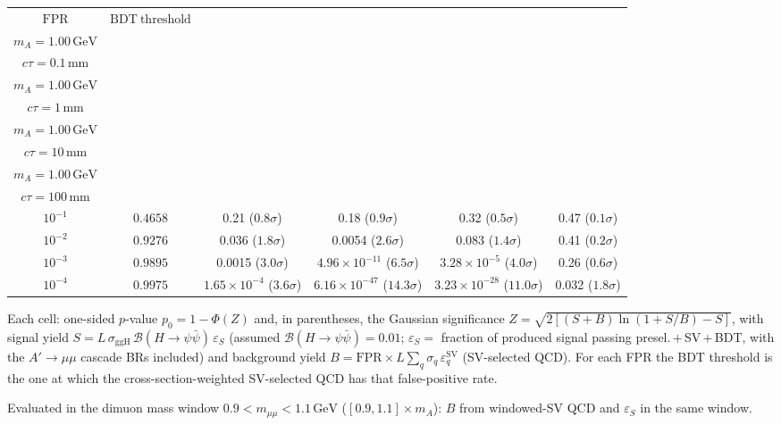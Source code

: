 \documentclass[10pt,a4paper]{article}
\begin{document}
{\begin{tabular}{cccccc}
\toprule
$\mathrm{FPR}$ & $\mathrm{BDT\ threshold}$ & \shortstack{$m_{\pi}=10\,\mathrm{GeV}$\\$m_{A}=1.00\,\mathrm{GeV}$\\$c\tau=0.1\,\mathrm{mm}$} & \shortstack{$m_{\pi}=10\,\mathrm{GeV}$\\$m_{A}=1.00\,\mathrm{GeV}$\\$c\tau=1\,\mathrm{mm}$} & \shortstack{$m_{\pi}=10\,\mathrm{GeV}$\\$m_{A}=1.00\,\mathrm{GeV}$\\$c\tau=10\,\mathrm{mm}$} & \shortstack{$m_{\pi}=10\,\mathrm{GeV}$\\$m_{A}=1.00\,\mathrm{GeV}$\\$c\tau=100\,\mathrm{mm}$} \\
\midrule
$10^{-1}$ & $0.4658$ & 0.21 ($0.8\sigma$) & 0.18 ($0.9\sigma$) & 0.32 ($0.5\sigma$) & 0.47 ($0.1\sigma$)\\
$10^{-2}$ & $0.9276$ & 0.036 ($1.8\sigma$) & 0.0054 ($2.6\sigma$) & 0.083 ($1.4\sigma$) & 0.41 ($0.2\sigma$)\\
$10^{-3}$ & $0.9895$ & 0.0015 ($3.0\sigma$) & $4.96\times10^{-11}$ ($6.5\sigma$) & $3.28\times10^{-5}$ ($4.0\sigma$) & 0.26 ($0.6\sigma$)\\
$10^{-4}$ & $0.9975$ & $1.65\times10^{-4}$ ($3.6\sigma$) & $6.16\times10^{-47}$ ($14.3\sigma$) & $3.23\times10^{-28}$ ($11.0\sigma$) & 0.032 ($1.8\sigma$)\\
\bottomrule
\end{tabular}

{\small Each cell: one-sided $p$-value $p_0=1-\Phi(Z)$ and, in parentheses, the Gaussian significance $Z=\sqrt{2\left[(S{+}B)\ln(1{+}S/B)-S\right]}$, with signal yield $S=L\,\sigma_{\mathrm{ggH}}\,\mathcal{B}(H\to\psi\bar{\psi})\,\varepsilon_S$ (assumed $\mathcal{B}(H\to\psi\bar{\psi})=0.01$; $\varepsilon_S=$ fraction of produced signal passing presel.\,$+$\,SV\,$+$\,BDT, with the $A'\to\mu\mu$ cascade BRs included) and background yield $B=\mathrm{FPR}\times L\sum_q\sigma_q\,\varepsilon_q^{\mathrm{SV}}$ (SV-selected QCD). For each FPR the BDT threshold is the one at which the cross-section-weighted SV-selected QCD has that false-positive rate.}

{\small Evaluated in the dimuon mass window $0.9<m_{\mu\mu}<1.1\,\mathrm{GeV}$ ($[0.9,1.1]\times m_A$): $B$ from windowed-SV QCD and $\varepsilon_S$ in the same window.}

}\clearpage
\end{document}
